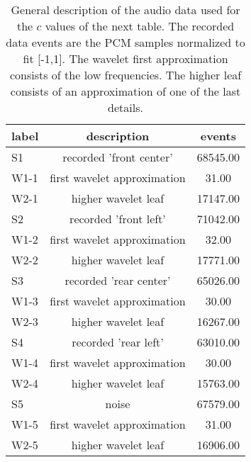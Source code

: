 \begin{table}[h!]
\begin{center}
\begin{tabular}{| l | c | c |}\hline
label & description & events \\\hline
S1 & recorded 'front center'  & 68545.00 \\\hline
W1-1 & first wavelet approximation  & 31.00 \\\hline
W2-1 & higher wavelet leaf  & 17147.00 \\\hline
S2 & recorded 'front left'  & 71042.00 \\\hline
W1-2 & first wavelet approximation  & 32.00 \\\hline
W2-2 & higher wavelet leaf  & 17771.00 \\\hline
S3 & recorded 'rear center'  & 65026.00 \\\hline
W1-3 & first wavelet approximation  & 30.00 \\\hline
W2-3 & higher wavelet leaf  & 16267.00 \\\hline
S4 & recorded 'rear left'  & 63010.00 \\\hline
W1-4 & first wavelet approximation  & 30.00 \\\hline
W2-4 & higher wavelet leaf  & 15763.00 \\\hline
S5 & noise  & 67579.00 \\\hline
W1-5 & first wavelet approximation  & 31.00 \\\hline
W2-5 & higher wavelet leaf  & 16906.00 \\\hline
\end{tabular}
\caption{General description of the audio data used for the $c$ values of the next table.
The recorded data events are the PCM samples normalized to fit [-1,1].
The wavelet first approximation consists of the low frequencies.
The higher leaf consists of an approximation of one of the last details.}
\end{center}
\end{table}
